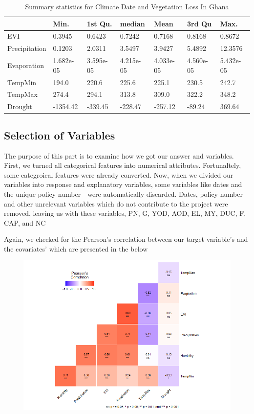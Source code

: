 \begin{table}[]
	\label{table:Summary Statistics}
	\caption{Summary statistics for Climate Date and Vegetation Loss In Ghana}
	\centering
	\begin{tabularx}{\textwidth}{|l*{3}{X|}*{3}{X|}}
		\toprule
		                   & Min.      & 1st Qu.& median & Mean & 3rd Qu & Max.  \\ \midrule
		EVI                &   0.3945  & 0.6423 & 0.7242 & 0.7168  & 0.8168&0.8672 \\
		Precipitation      &   0.1203  & 2.0311& 3.5497 &  3.9427 & 5.4892&12.3576 \\
		Evaporation & 1.682e-05 &3.595e-05&4.215e-05 &4.033e-05 & 4.560e-05&5.432e-05 \\
		TempMin            &   194.0 & 220.6  & 225.6  & 225.1 & 230.5 &242.7 \\
		TempMax            &   274.4 & 294.1 & 313.8& 309.0  &  322.2&348.2 \\ 
		Drought            &  -1354.42 & -339.45 & -228.47&-257.12 & -89.24&369.64 \\ \bottomrule
	\end{tabularx}
\end{table}
\subsection{Selection of Variables}
The purpose of this part is to examine how we got our answer and variables. First, we turned all categorical features into numerical attributes. Fortunaltely, some categroical features were already converted. Now, when we divided our variables into response and explanatory variables, some variables like dates and the unique policy number—were automatically discarded. Dates, policy number and other unrelevant variables which do not contribute to the project were removed, leaving us with these variables, PN, G, YOD, AOD, EL, MY, DUC, F, CAP, and NC

Again, we checked for the Pearson’s correlation between our target variable’s and the covariates’ which are presented in the below
\begin{figure}
	\centering
	\includegraphics[width=0.9\linewidth]{images/Correlation}
	\caption{}
	\label{fig:Correlation}
\end{figure}


